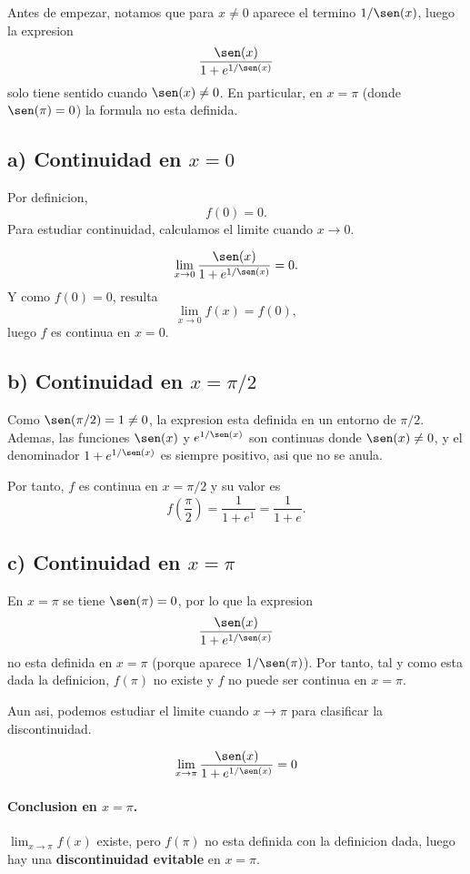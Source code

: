 \documentclass[12pt]{article}
\begin{document}
Antes de empezar, notamos que para $x\ne 0$ aparece el termino $1/\sen(x)$, luego la expresion
\[
\frac{\sen(x)}{1+e^{1/\sen(x)}}
\]
solo tiene sentido cuando $\sen(x)\ne 0$. En particular, en $x=\pi$ (donde $\sen(\pi)=0$) la formula no esta definida.

\subsection*{a) Continuidad en $x=0$}

Por definicion,
\[
f(0)=0.
\]
Para estudiar continuidad, calculamos el limite cuando $x\to 0$.

\[
\lim_{x\to 0} \frac{\sen(x)}{1+e^{1/\sen(x)}} = 0.
\]
Y como $f(0)=0$, resulta
\[
\lim_{x\to 0} f(x)=f(0),
\]
luego $f$ es continua en $x=0$.

\subsection*{b) Continuidad en $x=\pi/2$}

Como $\sen(\pi/2)=1\ne 0$, la expresion esta definida en un entorno de $\pi/2$.
Ademas, las funciones $\sen(x)$ y $e^{1/\sen(x)}$ son continuas donde $\sen(x)\ne 0$,
y el denominador $1+e^{1/\sen(x)}$ es siempre positivo, asi que no se anula.

Por tanto, $f$ es continua en $x=\pi/2$ y su valor es
\[
f\left(\frac{\pi}{2}\right)=\frac{1}{1+e^{1}}=\frac{1}{1+e}.
\]

\subsection*{c) Continuidad en $x=\pi$}

En $x=\pi$ se tiene $\sen(\pi)=0$, por lo que la expresion
\[
\frac{\sen(x)}{1+e^{1/\sen(x)}}
\]
no esta definida en $x=\pi$ (porque aparece $1/\sen(\pi)$). Por tanto, tal y como esta dada la definicion, $f(\pi)$ no existe y $f$ no puede ser continua en $x=\pi$.

Aun asi, podemos estudiar el limite cuando $x\to \pi$ para clasificar la discontinuidad.

\[
\lim_{x\to \pi}\frac{\sen(x)}{1+e^{1/\sen(x)}} = 0
\]

\paragraph{Conclusion en $x=\pi$.}
$\lim_{x\to \pi}f(x)$ existe, pero $f(\pi)$ no esta definida con la definicion dada, luego hay una \textbf{discontinuidad evitable} en $x=\pi$.
\end{document}
